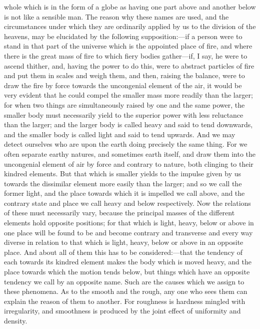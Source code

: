 \documentclass[12pt]{article}
\begin{document}
whole which is in the form of a globe as having one part above and another below is not like a sensible man. The reason why these names are used, and the circumstances under which they are ordinarily applied by us to the division of the heavens, may be elucidated by the following supposition:---if a person were to stand in that part of the universe which is the appointed place of fire, and where there is the great mass of fire to which fiery bodies gather---if, I say, he were to ascend thither, and, having the power to do this, were to abstract particles of fire and put them in scales and weigh them, and then, raising the balance, were to draw the fire by force towards the uncongenial element of the air, it would be very evident that he could compel the smaller mass more readily than the larger; for when two things are simultaneously raised by one and the same power, the smaller body must necessarily yield to the superior power with less reluctance than the larger; and the larger body is called heavy and said to tend downwards, and the smaller body is called light and said to tend upwards. And we may detect ourselves who are upon the earth doing precisely the same thing. For we often separate earthy natures, and sometimes earth itself, and draw them into the uncongenial element of air by force and contrary to nature, both clinging to their kindred elements. But that which is smaller yields to the impulse given by us towards the dissimilar element more easily than the larger; and so we call the former light, and the place towards which it is impelled we call above, and the contrary state and place we call heavy and below respectively. Now the relations of these must necessarily vary, because the principal masses of the different elements hold opposite positions; for that which is light, heavy, below or above in one place will be found to be and become contrary and transverse and every way diverse in relation to that which is light, heavy, below or above in an opposite place. And about all of them this has to be considered:---that the tendency of each towards its kindred element makes the body which is moved heavy, and the place towards which the motion tends below, but things which have an opposite tendency we call by an opposite name. Such are the causes which we assign to these phenomena. As to the smooth and the rough, any one who sees them can explain the reason of them to another. For roughness is hardness mingled with irregularity, and smoothness is produced by the joint effect of uniformity and density.
\end{document}

